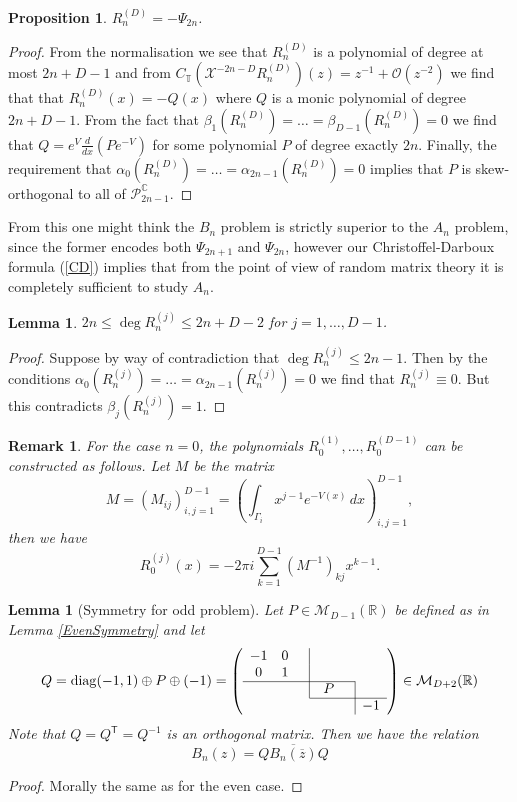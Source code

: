 \documentclass[12pt]{article}
\newtheorem{lemma}[theorem]{Lemma}
\newtheorem{remark}[theorem]{Remark}
\newtheorem{proposition}[theorem]{Proposition}
\newcommand*{\bord}{\multicolumn{1}{c|}{}}
\theoremstyle{definition}
\begin{document}
\begin{proposition} $R^{(D)}_n = - \Psi_{2n}$. 
\end{proposition}
\begin{proof}
From the normalisation we see that $R^{(D)}_n$ is a polynomial of degree at most $2n+D-1$ and from $C_\mathbb{T}( \mathscr{X}^{-2n-D} R^{(D)}_n)(z) = z^{-1}+\mathcal{O}(z^{-2})$ we find that that $R^{(D)}_n(x) = - Q(x)$ where $Q$ is a monic polynomial of degree $2n+D-1$. From the fact that $\beta_1(R^{(D)}_n) = \dots = \beta_{D-1}(R^{(D)}_n) = 0$ we find that $Q = e^V \frac{d}{dx}( P e^{-V})$ for some polynomial $P$ of degree exactly $2n$. Finally, the requirement that $\alpha_0(R^{(D)}_n) = \dots = \alpha_{2n-1}(R^{(D)}_n) = 0$ implies that $P$ is skew-orthogonal to all of $\mathscr{P}_{2n-1}^\mathbb{C}$. 
\end{proof}
From this one might think the $B_n$ problem is strictly superior to the $A_n$ problem, since the former encodes both $\Psi_{2n+1}$ and $\Psi_{2n}$, however our Christoffel-Darboux formula (\ref{CD}) implies that from the point of view of random matrix theory it is completely sufficient to study $A_n$.
\begin{lemma} $ 2n \leq  \deg R_n^{(j)} \leq 2n+D-2$ for $j=1,\dots, D-1$.
\end{lemma}
\begin{proof}
Suppose by way of contradiction that $ \deg R_n^{(j)} \leq 2n-1$. Then by the conditions $\alpha_0 (R_n^{(j)}) = \dots = \alpha_{2n-1}( R_n^{(j)} ) = 0$ we find that $R_n^{(j)} \equiv 0$. But this contradicts $\beta_j (R_n^{(j)}) = 1$.
\end{proof}
\begin{remark}\label{zero} For the case $n=0$, the polynomials $R_0^{(1)} , \dots, R_0^{(D-1)}$ can be constructed as follows.  Let $M$ be the matrix
$$M = (M_{ij})_{i,j=1}^{D-1} =  \left( \int_{\Gamma_i} x^{j-1} e^{-V(x)} \, dx \right)_{i,j=1}^{D-1} , $$
then we have
$$R^{(j)}_0(x) = - 2\pi i \sum_{k=1}^{D-1} (M^{-1})_{kj} x^{k-1} .$$
\end{remark}

\begin{lemma}[Symmetry for odd problem]\label{OddSymmetry} Let $P \in \mathcal{M}_{D-1}(\mathbb{R})$ be defined as in Lemma \ref{EvenSymmetry}  and let $$Q = \mathrm{diag}(-1,1) \oplus P \oplus (-1) = \left( \begin{array}{ccccccc} -1 & 0 & \bord & \\
0 & 1 &  \bord & &\\ \cline{1-5}
& &  \bord & \, \,  \, P & \bord & \\\cline{4-6}
& & & & \bord & -1 \end{array} \right) \in \mathcal{M}_{D+2}(\mathbb{R}) $$ Note that $Q = Q^\mathsf{T}= Q^{-1}$ is an orthogonal matrix.  Then we have the relation
$$B_{n}(z) = Q \overline{B_{n}(\overline{z}) } Q$$
\end{lemma}
\begin{proof}
Morally the same as for the even case.
\end{proof}
\end{document}

